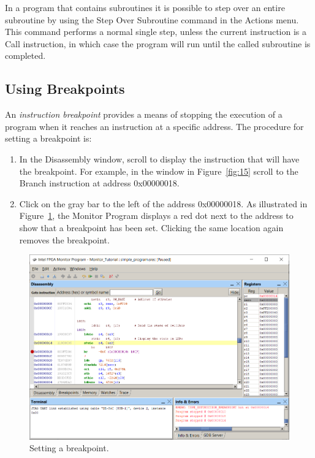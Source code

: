 \documentclass[11pt, twoside, pdftex]{article}
\begin{document}
In a program that contains subroutines it is possible to step
over an entire subroutine by using the
{\sf Step Over Subroutine} command in the {\sf Actions} menu.
This command performs a normal single step, unless the current
instruction is a Call instruction, in which case the program will
run until the called subroutine is completed.

\subsection{Using Breakpoints}

An {\it instruction breakpoint} provides a means of stopping the
execution of a program when it reaches an instruction at a
specific address.  The procedure for setting a breakpoint is:

\begin{enumerate}
\item In the Disassembly window, scroll to display the instruction that will have the breakpoint. For example, 
in the window in Figure~\ref{fig:15} scroll
to the Branch instruction at address 0x00000018. 

\item Click on the gray bar to the left of the address
0x00000018. As illustrated in Figure~\ref{fig:17},
the Monitor Program displays a red dot next to the address
to show that a breakpoint has been set. 
Clicking the same location again removes the breakpoint.
\end{enumerate}

\begin{figure}[H]
   \begin{center}
      \includegraphics[scale=0.6]{screenshots/figure17.png}
   \end{center}
   \caption{Setting a breakpoint.} 
	 \label{fig:17}
\end{figure}
\end{document}
